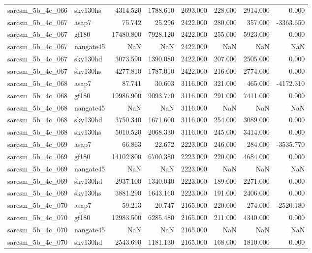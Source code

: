 \begin{tabular}{llrrrrrr}
sarcsm\_5b\_4c\_066 & sky130hs & 4314.520 & 1788.610 & 2693.000 & 228.000 & 2914.000 & 0.000 \\
sarcsm\_5b\_4c\_067 & asap7 & 75.742 & 25.296 & 2422.000 & 280.000 & 357.000 & -3363.650 \\
sarcsm\_5b\_4c\_067 & gf180 & 17480.800 & 7928.120 & 2422.000 & 255.000 & 5923.000 & 0.000 \\
sarcsm\_5b\_4c\_067 & nangate45 & NaN & NaN & 2422.000 & NaN & NaN & NaN \\
sarcsm\_5b\_4c\_067 & sky130hd & 3073.590 & 1390.080 & 2422.000 & 207.000 & 2505.000 & 0.000 \\
sarcsm\_5b\_4c\_067 & sky130hs & 4277.810 & 1787.010 & 2422.000 & 216.000 & 2774.000 & 0.000 \\
sarcsm\_5b\_4c\_068 & asap7 & 87.741 & 30.603 & 3116.000 & 321.000 & 465.000 & -4172.310 \\
sarcsm\_5b\_4c\_068 & gf180 & 19986.900 & 9093.770 & 3116.000 & 291.000 & 7411.000 & 0.000 \\
sarcsm\_5b\_4c\_068 & nangate45 & NaN & NaN & 3116.000 & NaN & NaN & NaN \\
sarcsm\_5b\_4c\_068 & sky130hd & 3750.340 & 1671.600 & 3116.000 & 254.000 & 3089.000 & 0.000 \\
sarcsm\_5b\_4c\_068 & sky130hs & 5010.520 & 2068.330 & 3116.000 & 245.000 & 3414.000 & 0.000 \\
sarcsm\_5b\_4c\_069 & asap7 & 66.863 & 22.672 & 2223.000 & 246.000 & 284.000 & -3535.770 \\
sarcsm\_5b\_4c\_069 & gf180 & 14102.800 & 6700.380 & 2223.000 & 220.000 & 4684.000 & 0.000 \\
sarcsm\_5b\_4c\_069 & nangate45 & NaN & NaN & 2223.000 & NaN & NaN & NaN \\
sarcsm\_5b\_4c\_069 & sky130hd & 2937.100 & 1340.040 & 2223.000 & 189.000 & 2271.000 & 0.000 \\
sarcsm\_5b\_4c\_069 & sky130hs & 3881.290 & 1643.160 & 2223.000 & 191.000 & 2406.000 & 0.000 \\
sarcsm\_5b\_4c\_070 & asap7 & 59.213 & 20.747 & 2165.000 & 220.000 & 274.000 & -2520.180 \\
sarcsm\_5b\_4c\_070 & gf180 & 12983.500 & 6285.480 & 2165.000 & 211.000 & 4340.000 & 0.000 \\
sarcsm\_5b\_4c\_070 & nangate45 & NaN & NaN & 2165.000 & NaN & NaN & NaN \\
sarcsm\_5b\_4c\_070 & sky130hd & 2543.690 & 1181.130 & 2165.000 & 168.000 & 1810.000 & 0.000 \\

\end{tabular}
